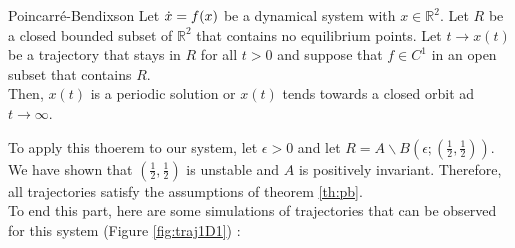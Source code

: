 \documentclass{article}
\begin{document}
\begin{theorem}{Poincarré-Bendixson}
\label{th:pb}
Let $\dot{x} = f(x)$ be a dynamical system with $x \in \mathbb{R}^2$. Let $R$ be a closed bounded subset of $\mathbb{R}^2$ that contains no equilibrium points. Let $t\rightarrow x(t)$ be a trajectory that stays in $R$ for all $t > 0$ and suppose that $f \in C^1$ in an open subset that contains $R$.\\
Then, $x(t)$ is a periodic solution or $x(t)$ tends towards a closed orbit ad $t \rightarrow \infty$.
\end{theorem}

To apply this thoerem to our system, let $\epsilon > 0$ and let $R = A \backslash B(\epsilon;(\frac{1}{2},\frac{1}{2}))$. We have shown that $(\frac{1}{2},\frac{1}{2})$ is unstable and $A$ is positively invariant. Therefore, all trajectories satisfy the assumptions of theorem \ref{th:pb}. \\

To end this part, here are some simulations of trajectories that can be observed for this system (Figure \ref{fig:traj1D1}) :
\end{document}
